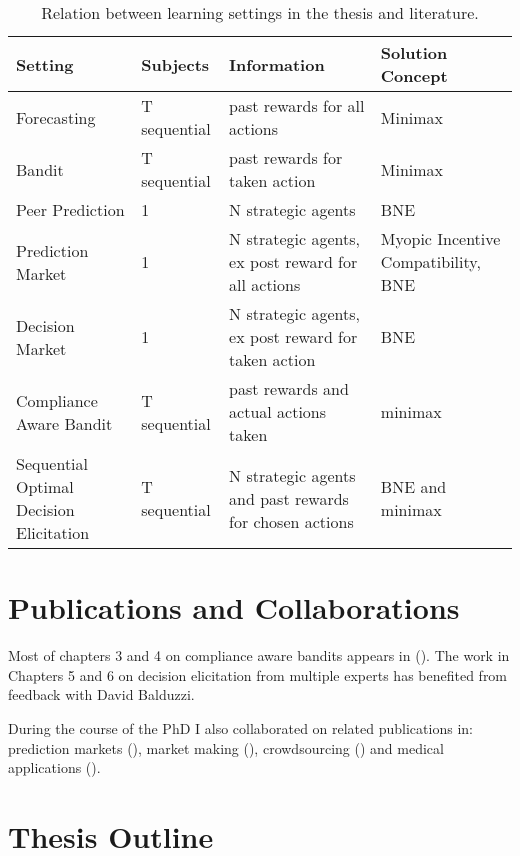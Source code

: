 \begin{table}
	\begin{tabular}{llll}
		\toprule
		Setting & Subjects & Information & Solution Concept\\
		\midrule
		Forecasting & T sequential & past rewards for all actions & Minimax  \\
		Bandit & T sequential & past rewards for taken action  &  Minimax  \\
		Peer Prediction & 1 & N strategic agents & BNE \\
		Prediction Market & 1 & N strategic agents, ex post reward for all actions & Myopic Incentive Compatibility, BNE\\
		Decision Market & 1 & N strategic agents, ex post reward for taken action & BNE  \\
		Compliance Aware Bandit & T sequential & past rewards and actual actions taken & minimax \\
		Sequential Optimal Decision Elicitation  & T sequential &  N strategic agents and past rewards for chosen actions & BNE and minimax \\
		\bottomrule
	\end{tabular}
	\caption{Relation between learning settings in the thesis and literature.}
\end{table}


\section{Publications and Collaborations}

Most of chapters 3 and 4 on compliance aware bandits appears in (\cite{della2016compliance}). The work in Chapters 5 and 6 on decision elicitation from multiple experts has benefited from feedback with David Balduzzi.

During the course of the PhD I also collaborated on related publications in: prediction markets (\cite{frongillo2012interpreting}), market making (\cite{kinathil2014closed,kinathil2016symbolic}), crowdsourcing (\cite{della2012crowd}) and medical applications (\cite{della2016out}).


\section{Thesis Outline}
\label{sec:outline}

